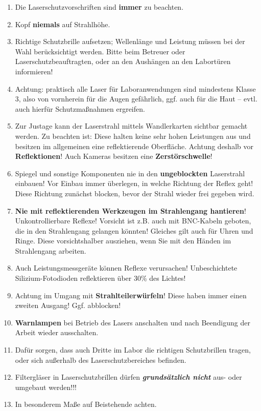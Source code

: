 \documentclass[
class=book,
accentcolor=1b,
custommargins=geometry,
fontsize=11pt,
thesis={type=Versuchsanleitung},
ruledheaders=all,
headline=false,
instbox=false,
marginpar=false,
title=small,
ignore-missing-data=true,
twoside=false,
pdfa=false %
]{apqpub}
\begin{document}
\begin{enumerate}
\item Die Laserschutzvorschriften sind \textbf{immer} zu beachten.
\vspace{-2pt}
\item Kopf \textbf{niemals} auf Strahlhöhe.
\vspace{-2pt}
\item Richtige Schutzbrille aufsetzen; Wellenlänge und Leistung müssen bei der Wahl berücksichtigt werden. Bitte beim Betreuer oder Laserschutzbeauftragten, oder an den Aushängen an den Labortüren informieren!
\vspace{-2pt}
\item Achtung: praktisch alle Laser für Laboranwendungen sind mindestens Klasse 3, also von vornherein für die Augen gefährlich, ggf. auch für die Haut -- evtl. auch hierfür Schutzmaßnahmen ergreifen.
\vspace{-2pt}
\item Zur Justage kann der Laserstrahl mittels Wandlerkarten sichtbar gemacht werden. Zu beachten ist: Diese halten keine sehr hohen Leistungen aus und besitzen im allgemeinen eine reflektierende Oberfläche. Achtung deshalb vor \textbf{Reflektionen}! Auch Kameras
besitzen eine \textbf{Zerstörschwelle}!
\vspace{-2pt}
\item Spiegel und sonstige Komponenten nie in den \textbf{ungeblockten} Laserstrahl einbauen! Vor Einbau immer überlegen, in welche Richtung der Reflex geht! Diese Richtung zunächst blocken, bevor der Strahl wieder frei gegeben wird.
\vspace{-2pt}
\item \textbf{Nie mit reflektierenden Werkzeugen im Strahlengang hantieren}! Unkontrollierbare Reflexe! Vorsicht ist z.B. auch mit BNC-Kabeln geboten, die in den Strahlengang gelangen könnten!
Gleiches gilt auch für Uhren und Ringe. Diese vorsichtshalber ausziehen, wenn Sie mit den Händen im Strahlengang arbeiten.
\vspace{-2pt}
\item Auch Leistungsmessgeräte können Reflexe verursachen! Unbeschichtete Silizium-Fotodioden reflektieren über 30\% des Lichtes!
\vspace{-2pt}
\item Achtung im Umgang mit \textbf{Strahlteilerwürfeln}! Diese haben immer einen zweiten Ausgang! Ggf. abblocken!
\vspace{-2pt}
\item \textbf{Warnlampen} bei Betrieb des Lasers anschalten und nach Beendigung der Arbeit wieder ausschalten.
\vspace{-2pt}
\item Dafür sorgen, dass auch Dritte im Labor die richtigen Schutzbrillen tragen, oder sich außerhalb des Laserschutzbereiches befinden.
\vspace{-2pt}
\item Filtergläser in Laserschutzbrillen dürfen \textbf{\textit{grundsätzlich nicht}} aus- oder umgebaut
werden!!!
\vspace{-2pt}
\item In besonderem Maße auf Beistehende achten.
\end{enumerate}
\end{document}

